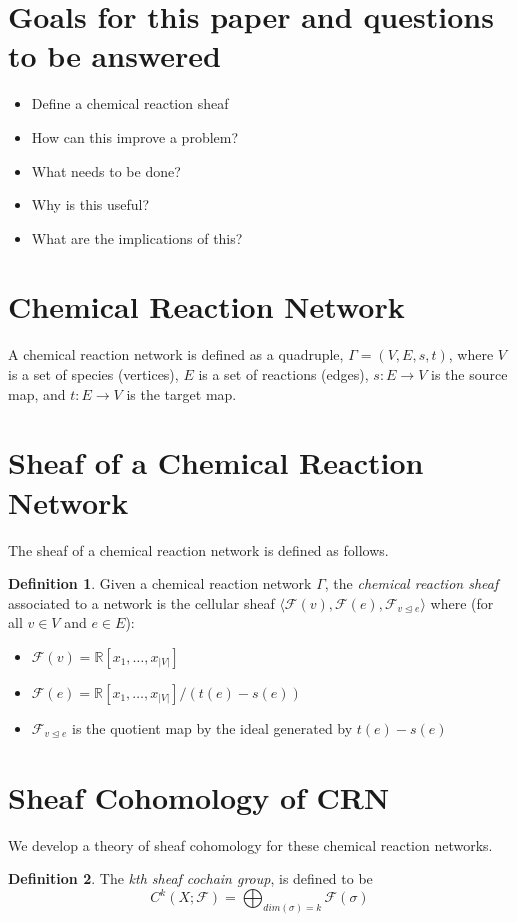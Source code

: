 \documentclass[12pt]{article}
\theoremstyle{definition}
\newtheorem{definition}{Definition}
\newcommand{\F}{\mathcal{F}}
\newcommand{\<}{\langle}
\renewcommand{\>}{\rangle}
\begin{document}
\section{Goals for this paper and questions to be answered}
\begin{itemize}
  \item Define a chemical reaction sheaf
  \item How can this improve a problem?
  \item What needs to be done?
  \item Why is this useful?
  \item What are the implications of this?
\end{itemize}

\section{Chemical Reaction Network}
A chemical reaction network is defined as a quadruple, $\Gamma = (V, E, s, t)$, where $V$ is a set of
species (vertices), $E$ is a set of reactions (edges), $s: E \to V$ is the source map, and
$t: E \to V$ is the target map.
\section{Sheaf of a Chemical Reaction Network}
The sheaf of a chemical reaction network is defined as follows.

\begin{definition} Given a chemical reaction network $\Gamma$, the \textit{chemical reaction sheaf} associated to a 
network is the cellular sheaf $ \< \F(v) , \F(e), \F_{v \trianglelefteq e} \>$ where
(for all $v \in V $ and $e \in E$):

\begin{itemize}
  \item $\F(v) = \mathbb{R}[x_1, \ldots, x_{|V|}]$
  \item $\F(e) = \mathbb{R}[x_1, \ldots, x_{|V|}] / (t(e) - s(e))$
  \item $\F_{v \trianglelefteq e}$ is the quotient map by the ideal generated
    by $t(e) - s(e)$
\end{itemize}
\end{definition}

\section{Sheaf Cohomology of CRN}

We develop a theory of sheaf cohomology for these chemical reaction networks. 
\begin{definition}
  The \textit{kth sheaf cochain group}, is defined to be
  \begin{equation*}
    C^k(X ; \F) = \bigoplus_{dim(\sigma) = k} \F(\sigma)
  \end{equation*}
\end{definition}
\end{document}
